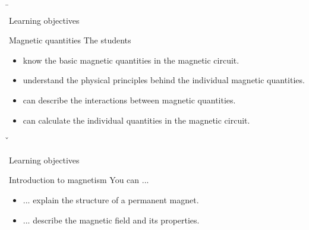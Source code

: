 \b{
	\begin{frame}{Learning objectives}
		\begin{Learning objectives}{Magnetic quantities}
			The students
			\begin{itemize}
				\item know the basic magnetic quantities in the magnetic circuit.
				\item understand the physical principles behind the individual magnetic quantities.
				\item can describe the interactions between magnetic quantities.
				\item can calculate the individual quantities in the magnetic circuit.
			\end{itemize}
		\end{Learning objectives}
	\end{frame}
}
\v{
	\begin{frame}{Learning objectives}
		\begin{Lernziele}{Introduction to magnetism}
			You can ...
			\begin{itemize}
				\item ... explain the structure of a permanent magnet.
				\item ... describe the magnetic field and its properties.
			\end{itemize}
		\end{Lernziele}
	\end{frame}
}

